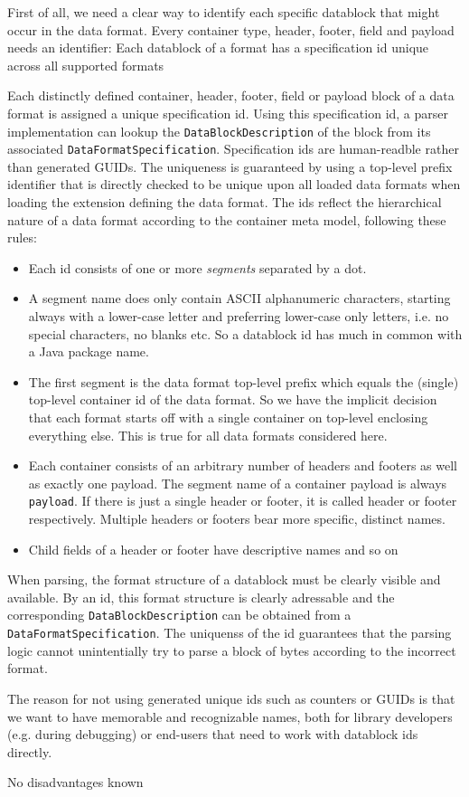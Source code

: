 First of all, we need a clear way to identify each specific datablock that might occur in the data format. Every container type, header, footer, field and payload needs an identifier:
{%
Each datablock of a format has a specification id unique across all supported formats
}
{%
Each distinctly defined container, header, footer, field or payload block of a data format is assigned a unique specification id. Using this specification id, a parser implementation can lookup the \texttt{DataBlockDescription} of the block from its associated \texttt{DataFormatSpecification}. Specification ids are human-readble rather than generated GUIDs. The uniqueness is guaranteed by using a top-level prefix identifier that is directly checked to be unique upon all loaded data formats when loading the extension defining the data format. The ids reflect the hierarchical nature of a data format according to the container meta model, following these rules:
\begin{itemize}
\item Each id consists of one or more \emph{segments} separated by a dot.
\item A segment name does only contain ASCII alphanumeric characters, starting always with a lower-case letter and preferring lower-case only letters, i.e. no special characters, no blanks etc. So a datablock id has much in common with a Java package name. 
\item The first segment is the data format top-level prefix which equals the (single) top-level container id of the data format. So we have the implicit decision that each format starts off with a single container on top-level enclosing everything else. This is true for all data formats considered here.
\item Each container consists of an arbitrary number of headers and footers as well as exactly one payload. The segment name of a container payload is always \texttt{payload}. If there is just a single header or footer, it is called header or footer respectively. Multiple headers or footers bear more specific, distinct names.
\item Child fields of a header or footer have descriptive names and so on 
\end{itemize}
}
{%
When parsing, the format structure of a datablock must be clearly visible and available. By an id, this format structure is clearly adressable and the corresponding \texttt{DataBlockDescription} can be obtained from a \texttt{DataFormatSpecification}. The uniquenss of the id guarantees that the parsing logic cannot unintentially try to parse a block of bytes according to the incorrect format.

The reason for not using generated unique ids such as counters or GUIDs is that we want to have memorable and recognizable names, both for library developers (e.g. during debugging) or \LibName{} end-users that need to work with datablock ids directly. 
}
{%
No disadvantages known
}


